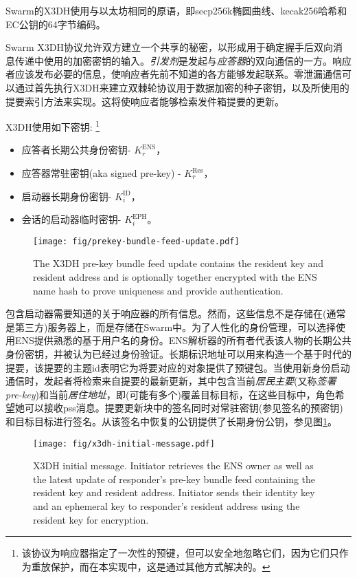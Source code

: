 Swarm的X3DH使用与以太坊相同的原语，即secp256k椭圆曲线、kecak256哈希和EC公钥的64字节编码。 

Swarm X3DH协议允许双方建立一个共享的秘密，以形成用于确定握手后双向消息传递中使用的加密密钥的输入。\emph{引发剂}是发起与\emph{应答器}的双向通信的一方。响应者应该发布必要的信息，使响应者先前不知道的各方能够发起联系。零泄漏通信可以通过首先执行X3DH来建立双棘轮协议用于数据加密的种子密钥，以及所使用的提要索引方法来实现。这将使响应者能够检索发件箱提要的更新。

X3DH使用如下密钥:%
%
\footnote{该协议为响应器指定了一次性的预键，但可以安全地忽略它们，因为它们只作为重放保护，而在本实现中，这是通过其他方式解决的。}

\begin{itemize}
\item 应答者长期公共身份密钥- $K^{\mathrm{ENS}}_r$，
\item 应答器常驻密钥(aka signed pre-key) - $K^{\mathrm{Res}}_r$，
\item 启动器长期身份密钥- $K^{\mathrm{ID}}_i$，
\item 会话的启动器临时密钥- $K^{\mathrm{EPH}}_i$。
\end{itemize}{}



\begin{figure}[htbp]
   \centering
   \texttt{[image: fig/prekey-bundle-feed-update.pdf]}
   \caption[X3DH pre-key bundle feed update \statusgreen]{The X3DH pre-key bundle feed update contains the resident key and resident address and is optionally together encrypted with the ENS name hash to prove uniqueness and provide authentication.}
\label{fig:prekey-bundle-feed-update}
\end{figure}


包含启动器需要知道的关于响应器的所有信息。然而，这些信息不是存储在(通常是第三方)服务器上，而是存储在Swarm中。为了人性化的身份管理，可以选择使用ENS提供熟悉的基于用户名的身份。ENS解析器的所有者代表该人物的长期公共身份密钥，并被认为已经过身份验证。长期标识地址可以用来构造一个基于时代的提要，该提要的主题id表明它为将要对应的对象提供了预键包。当使用新身份启动通信时，发起者将检索来自提要的最新更新，其中包含当前\emph{居民主要}(又称\emph{签署pre-key})和当前\emph{居住地址}，即(可能有多个)覆盖目标目标，在这些目标中，角色希望她可以接收pss消息。提要更新块中的签名同时对常驻密钥(参见签名的预密钥)和目标目标进行签名。从该签名中恢复的公钥提供了长期身份公钥，参见图\ref{fig:prekey-bundle-feed-update}。


\begin{figure}[htbp]
   \centering
   \texttt{[image: fig/x3dh-initial-message.pdf]}
   \caption[X3DH initial message \statusgreen]{X3DH initial message. Initiator retrieves the ENS owner as well as the latest update of responder's pre-key bundle feed containing the resident key and resident address. Initiator sends their identity key and an ephemeral key to responder's resident address using the resident key for encryption. }
\label{fig:x3dh-initial-message}
\end{figure}


